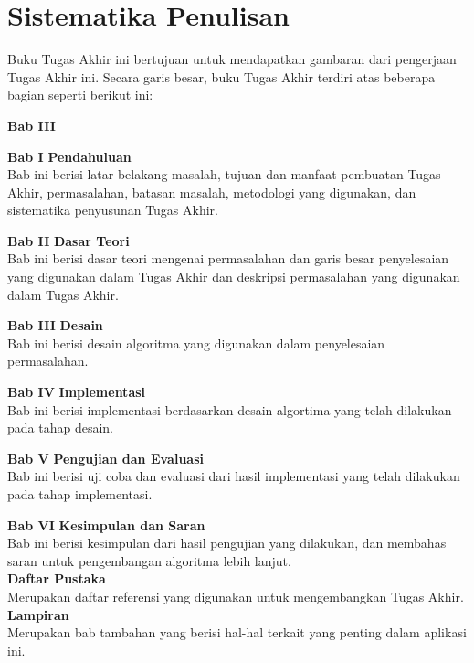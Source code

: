     \section{Sistematika Penulisan}	
	    Buku Tugas Akhir ini bertujuan untuk mendapatkan gambaran dari pengerjaan Tugas Akhir ini. Secara garis besar, buku Tugas Akhir terdiri atas beberapa bagian seperti berikut ini:
	    \begin{labeling}{\textbf{Bab III}}
	    	\item[\textbf{Bab I}] 
		    	\textbf{Pendahuluan}\\
				Bab ini berisi latar belakang masalah, tujuan dan manfaat pembuatan Tugas Akhir, permasalahan, batasan masalah, metodologi yang digunakan, dan sistematika penyusunan Tugas Akhir. 
	    	\item[\textbf{Bab II}] \textbf{Dasar Teori} \\
		    	Bab ini berisi dasar teori mengenai permasalahan dan garis besar penyelesaian yang digunakan dalam Tugas Akhir dan deskripsi permasalahan yang digunakan dalam Tugas Akhir.
	    	\item[\textbf{Bab III}] \textbf{Desain} \\ 
		    	Bab ini berisi desain algoritma yang digunakan dalam penyelesaian permasalahan.
	    	\item[\textbf{Bab IV}] \textbf{Implementasi} \\
		    	Bab ini berisi implementasi berdasarkan desain algortima yang telah dilakukan pada tahap desain.	
	    	\item[\textbf{Bab V}] \textbf{Pengujian dan Evaluasi} \\
		    	Bab ini berisi uji coba dan evaluasi dari hasil implementasi yang telah dilakukan pada tahap implementasi.
	    	\item[\textbf{Bab VI}] 	\textbf{Kesimpulan dan Saran}\\
    	Bab ini berisi kesimpulan dari hasil pengujian yang dilakukan, dan membahas saran untuk pengembangan algoritma lebih lanjut. \\
\textbf{Daftar Pustaka}\\
Merupakan daftar referensi yang digunakan untuk mengembangkan Tugas Akhir.\\
		\textbf{Lampiran}\\
		Merupakan bab tambahan yang berisi hal-hal terkait yang penting dalam aplikasi ini.
		\end{labeling}